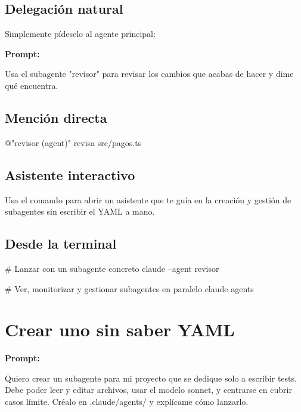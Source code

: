 \documentclass[11pt,a4paper]{report}
\DeclareRobustCommand{\texttt}[1]{{\ttfamily\seqsplit{#1}}}
\begin{document}
\subsection{Delegación natural}

Simplemente pídeselo al agente principal:

\noindent\textbf{Prompt: }
\begin{codebox}
Usa el subagente "revisor" para revisar los cambios que acabas de hacer y dime qué encuentra.
\end{codebox}

\subsection{Mención directa}

\begin{codebox}
@"revisor (agent)" revisa src/pagos.ts
\end{codebox}

\subsection{Asistente interactivo}

Usa el comando \texttt{/agents} para abrir un asistente que te guía en la creación y gestión de subagentes sin escribir el YAML a mano.

\subsection{Desde la terminal}

\begin{codebox}
# Lanzar con un subagente concreto
claude --agent revisor

# Ver, monitorizar y gestionar subagentes en paralelo
claude agents
\end{codebox}

\section{Crear uno sin saber YAML}

\noindent\textbf{Prompt: }
\begin{codebox}
Quiero crear un subagente para mi proyecto que se dedique solo a escribir tests. Debe poder leer y editar archivos, usar el modelo sonnet, y centrarse en cubrir casos límite. Créalo en .claude/agents/ y explícame cómo lanzarlo.
\end{codebox}
\end{document}

